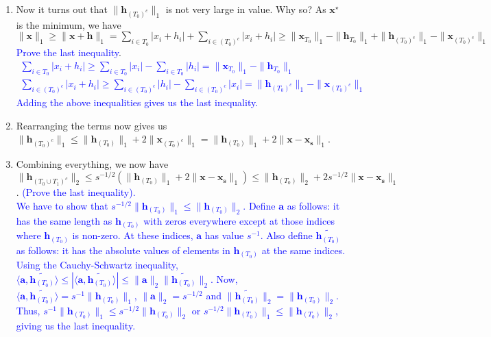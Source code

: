 \documentclass[11pt]{article}
\begin{document}
\begin{enumerate}
\begin{enumerate}
\begin{enumerate}
{}
\item Now it turns out that $\|\mathbf{h}_{(T_0)^c}\|_1$ is not very large in value. Why so? As $\mathbf{x}^{\star}$ is the minimum, we have $\|\mathbf{x}\|_1 \geq \|\mathbf{x}+\mathbf{h}\|_1 = \sum_{i \in T_0} |x_i + h_i| + \sum_{i \in {(T_0)}^c} |x_i + h_i| \geq \|\mathbf{x}_{T_0}\|_1 - \|\mathbf{h}_{T_0}\|_1 + \|\mathbf{h}_{{(T_0)}^c}\|_1 - \|\mathbf{x}_{{(T_0)^c}}\|_1$ \textcolor{blue}{Prove the last inequality}. \\
\textcolor{blue}{
\begin{gather*}
\sum_{i \in T_0} |x_i + h_i| \geq \sum_{i \in T_0}|x_i| - \sum_{i \in T_0}|h_i| = \|\mathbf{x}_{T_0}\|_1 - \|\mathbf{h}_{T_0}\|_1\\
\sum_{i \in {(T_0)}^c} |x_i + h_i| \geq \sum_{i \in {(T_0)}^c}|h_i| - \sum_{i \in {(T_0)}^c}|x_i| = \|\mathbf{h}_{{(T_0)}^c}\|_1 - \|\mathbf{x}_{{(T_0)^c}}\|_1
\end{gather*}
Adding the above inequalities gives us the last inequality.
}
\item Rearranging the terms now gives us $\|\mathbf{h}_{{(T_0)}^c}\|_1 \leq \|\mathbf{h}_{{(T_0)}}\|_1  + 2\|\mathbf{x}_{{(T_0)^c}}\|_1 = \|\mathbf{h}_{{(T_0)}}\|_1  + 2\|\mathbf{x}-\mathbf{x_s}\|_1$. 
\item Combining everything, we now have $\|\mathbf{h}_{(T_0 \cup T_1)^c}\|_2 \leq s^{-1/2}(\|\mathbf{h}_{{(T_0)}}\|_1  + 2\|\mathbf{x}-\mathbf{x_s}\|_1) \leq \|\mathbf{h}_{{(T_0)}}\|_2 + 2s^{-1/2} \|\mathbf{x}-\mathbf{x_s}\|_1$. \textcolor{blue}{(Prove the last inequality).}\\
\textcolor{blue}{
We have to show that $s^{-1/2}\|\mathbf{h}_{{(T_0)}}\|_1 \leq \|\mathbf{h}_{{(T_0)}}\|_2$. Define $\mathbf{a}$ as follows: it has the same length as $\mathbf{h}_{{(T_0)}}$ with zeros everywhere except at those indices where $\mathbf{h}_{{(T_0)}}$ is non-zero. At these indices, $\mathbf{a}$ has value $s^{-1}$. Also define $\tilde{\mathbf{h}_{{(T_0)}}}$ as follows: it has the absolute values of elements in $\mathbf{h}_{{(T_0)}}$ at the same indices. Using the Cauchy-Schwartz inequality, $\langle \mathbf{a},\tilde{\mathbf{h}_{{(T_0)}}}\rangle \leq |\langle \mathbf{a},\tilde{\mathbf{h}_{{(T_0)}}}\rangle| \leq \|\mathbf{a}\|_2\|\tilde{\mathbf{h}_{{(T_0)}}}\|_2$. Now, $\langle \mathbf{a},\tilde{\mathbf{h}_{{(T_0)}}}\rangle = s^{-1}\|\mathbf{h}_{(T_0)}\|_1$, $\|\mathbf{a}\|_2 = s^{-1/2}$ and $\|\tilde{\mathbf{h}_{{(T_0)}}}\|_2 = \|\mathbf{h}_{{(T_0)}}\|_2$. Thus, $s^{-1}\|\mathbf{h}_{(T_0)}\|_1 \leq s^{-1/2}\|\mathbf{h}_{{(T_0)}}\|_2$ or $s^{-1/2}\|\mathbf{h}_{{(T_0)}}\|_1 \leq \|\mathbf{h}_{{(T_0)}}\|_2$, giving us the last inequality.
}
\end{enumerate}
\end{enumerate}
\end{enumerate}
\end{document}
